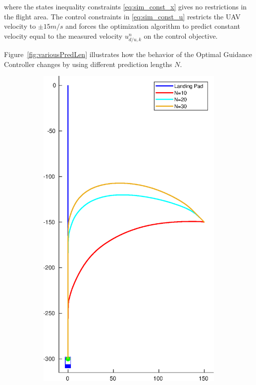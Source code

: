 where the states inequality constraints \ref{eq:sim_const_x} gives no restrictions in the flight area. The control constraints in \ref{eq:sim_const_u} restricts the \gls{UAV} velocity to $\pm15m/s$ and forces the optimization algorithm to predict constant velocity equal to the measured velocity $u^n_{d/u,k}$ on the control objective. 

Figure~\ref{fig:variousPredLen} illustrates how the behavior of the Optimal Guidance Controller changes by using different prediction lengths $N$.
\begin{figure}[ht!]
\centering
	\begin{subfigure}[b]{.5\textwidth}
		\centering
		\includegraphics[width=\linewidth]{img/plot/simulation/pred_length.eps}

\end{subfigure}
\end{figure}
